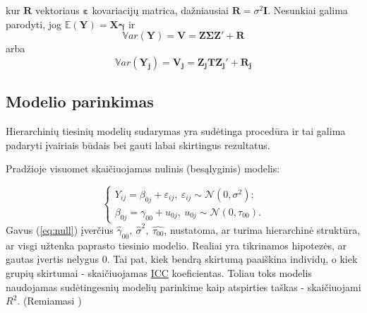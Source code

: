 \documentclass[12pt,a4paper]{article}
\begin{document}
kur $\mathbf{R}$ vektoriaus $\boldsymbol{\varepsilon}$ kovariacijų matrica, dažniausiai $\mathbf{R}=\sigma^2\mathbf{I}$. Nesunkiai galima parodyti, jog $\mathbb{E}(\mathbf{Y})=\mathbf{X}\boldsymbol{\gamma}$ ir
\begin{equation} \label{eq:var}
\mathbb{V}ar(\mathbf{Y})=\mathbf{V}=\mathbf{Z\Sigma Z}'+\mathbf{R}
\end{equation}
arba
\begin{equation} \label{eq:varj}
\mathbb{V}ar(\mathbf{Y_j})=\mathbf{V_j}=\mathbf{Z_jTZ_j}'+\mathbf{R_j}
\end{equation}


\subsection{Modelio parinkimas} \label{subsec:parink}
\indent Hierarchinių tiesinių modelių sudarymas yra sudėtinga procedūra ir tai galima padaryti įvairiais būdais bei gauti labai skirtingus rezultatus.

\indent Pradžioje visuomet skaičiuojamas nulinis (besąlyginis) modelis:

\begin{equation}\label{eq:null}
\left\{
\begin{array}{l}
Y_{ij}=\beta_{0j}+\varepsilon_{ij}, \ \varepsilon_{ij}\sim \mathcal{N}(0, \sigma^2);\\
\beta_{0j}=\gamma_{00}+u_{0j}, \ u_{0j}\sim \mathcal{N}(0, \tau_{00}).
\end{array} \right.
\end{equation}
\indent Gavus (\ref{eq:null}) įverčius $\hat{\gamma}_{00}, \ \hat{\sigma}^2,\ \hat{\tau_{00}}$, nustatoma, ar turima hierarchinė struktūra, ar visgi užtenka paprasto tiesinio modelio. Realiai yra tikrinamos hipotezės, ar gautas įvertis nelygus 0. Tai pat, kiek bendrą skirtumą paaiškina individų, o kiek grupių skirtumai - skaičiuojamas \hyperlink{icc}{ICC} koeficientas. Toliau toks modelis naudojamas sudėtingesnių modelių parinkime kaip atspirties taškas - skaičiuojami \hyperlink{r2}{$R^2$}. (Remiamasi \cite{cek})
\end{document}
